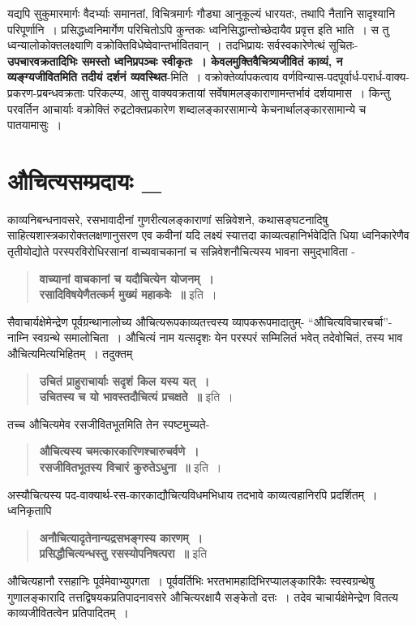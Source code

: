 {यद्यपि सुकुमारमार्गः वैदर्भ्याः समानतां, विचित्रमार्गः गौड्या आनुकूल्यं धारयतः, तथापि नैतानि सादृश्यानि परिपूर्णानि~। प्रसिद्धध्वनिमार्गेण परिचितोऽपि कुन्तकः ध्वनिसिद्धान्तोच्छेदायैव प्रवृत्त इति भाति~। स तु ध्वन्यालोकोक्तलक्ष्याणि वक्रोक्तिविधेष्वेवान्तर्भावितवान्~। तदभिप्रायः सर्वस्वकारेणेत्थं सूचितः- \textbf{उपचारवक्रतादिभिः समस्तो ध्वनिप्रपञ्चः स्वीकृतः~। केवलमुक्तिवैचित्र्यजीवितं काव्यं, न व्यङ्ग्यजीवितमिति तदीयं दर्शनं व्यवस्थित}-मिति~। वक्रोक्तेर्व्यापकत्वाय वर्णविन्यास-पदपूर्वार्ध-परार्ध-वाक्य-प्रकरण-प्रबन्धवक्रताः परिकल्प्य, आसु वाक्यवक्रतायां सर्वेषामलङ्काराणामन्तर्भावं दर्शयामास~। किन्तु परवर्तिन आचार्याः वक्रोक्तिं रुद्रटोक्तप्रकारेण शब्दालङ्कारसामान्ये केचनार्थालङ्कारसामान्ये च पातयामासुः~। 

\section*{ औचित्यसम्प्रदायः \_} 

काव्यनिबन्धनावसरे, रसभावादीनां गुणरीत्यलङ्काराणां सन्निवेशने, कथासङ्घटनादिषु साहित्यशास्त्रकारोक्तलक्षणानुसरण एव कवीनां यदि लक्ष्यं स्यात्तदा काव्यत्वहानिर्भवेदिति धिया ध्वनिकारेणैव तृतीयोद्योते परस्परविरोधिरसानां वाच्यवाचकानां च सन्निवेशनौचित्यस्य भावना समुद्भाविता - 
\begin{verse}
\textbf{वाच्यानां वाचकानां च यदौचित्येन योजनम्~। \\
रसादिविषयेणैतत्कर्म मुख्यं महाकवेः~॥} इति~। 
\end{verse}

सैवाचार्यक्षेमेन्द्रेण पूर्वग्रन्थानालोच्य औचित्यरूपकाव्यतत्त्वस्य व्यापकरूपमादातुम्- “औचित्यविचारचर्चा”- नाम्नि स्वग्रन्थे समालोचिता~। औचित्यं नाम यत्सदृशः येन परस्परं सम्मिलितं भवेत् तदेवोचितं, तस्य भाव औचित्यमित्यभिहितम्~। तदुक्तम्

\begin{verse}
\textbf{उचितं प्राहुराचार्याः सदृशं किल यस्य यत्~। \\
उचितस्य च यो भावस्तदौचित्यं प्रचक्षते~॥} इति~। 
\end{verse} 
तच्च औचित्यमेव रसजीवितभूतमिति तेन स्पष्टमुच्यते-
\begin{verse}
\textbf{औचित्यस्य चमत्कारकारिणश्चारुचर्वणे~। \\
रसजीवितभूतस्य विचारं कुरुतेऽधुना~॥} इति~। 
\end{verse}
अस्यौचित्यस्य पद-वाक्यार्थ-रस-कारकाद्यौचित्यविधमभिधाय तदभावे काव्यत्वहानिरपि प्रदर्शितम्~। ध्वनिकृतापि
\begin{verse}
\textbf{अनौचित्यादृतेनान्यद्रसभङ्गस्य कारणम्~। \\
प्रसिद्धौचित्यन्धस्तु रसस्योपनिषत्परा~॥} इति 
\end{verse}
औचित्यहानौ रसहानिः पूर्वमेवाभ्युपगता~। पूर्ववर्तिभिः भरतभामहादिभिरप्यालङ्कारिकैः स्वस्वग्रन्थेषु गुणालङ्कारादि तत्तद्विषयकप्रतिपादनावसरे औचित्यरक्षायै सङ्केतो दत्तः~। तदेव चाचार्यक्षेमेन्द्रेण वितत्य काव्यजीवितत्वेन प्रतिपादितम्~। 

}
